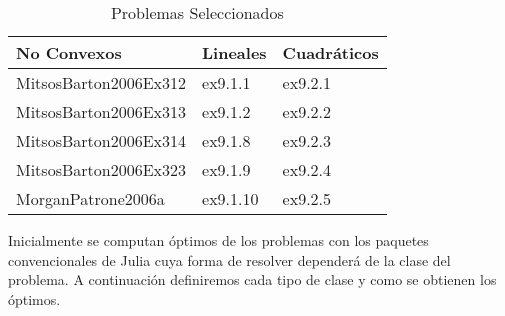 \begin{table}[H]
\centering
\caption{Problemas Seleccionados}
\begin{tabular}{ | m{5cm} | m{5cm} | m{5cm} | }
  
  \hline
  \textbf{No Convexos} & \textbf{Lineales} & \textbf{Cuadráticos} \\
  \hline
  MitsosBarton2006Ex312 & ex9.1.1 & ex9.2.1 \\
  \hline
  MitsosBarton2006Ex313 & ex9.1.2 & ex9.2.2 \\
  \hline
  MitsosBarton2006Ex314 & ex9.1.8 & ex9.2.3\\
  \hline
  MitsosBarton2006Ex323 & ex9.1.9 & ex9.2.4\\
  \hline
  MorganPatrone2006a & ex9.1.10 & ex9.2.5 \\
  \hline
\end{tabular}
\end{table}

Inicialmente se computan óptimos de los problemas con los paquetes convencionales de Julia
cuya forma de resolver dependerá de la clase del problema. A continuación definiremos cada tipo de clase y como se obtienen los óptimos. 


